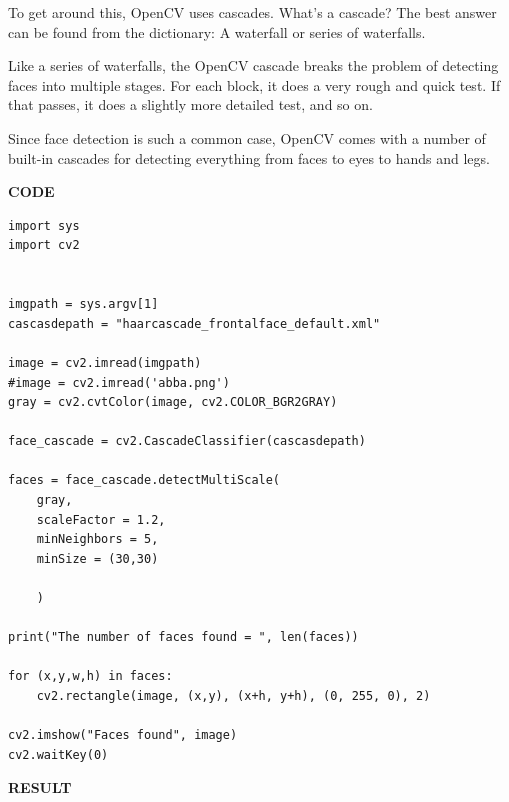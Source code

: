 \documentclass[14pt,a4paper]{article}
\begin{document}
\par To get around this, OpenCV uses cascades. What’s a cascade? The best answer can be found from the dictionary: A waterfall or series of waterfalls.
\par Like a series of waterfalls, the OpenCV cascade breaks the problem of detecting faces into multiple stages. For each block, it does a very rough and quick test. If that passes, it does a slightly more detailed test, and so on.
\par Since face detection is such a common case, OpenCV comes with a number of built-in cascades for detecting everything from faces to eyes to hands and legs.
\par
\textbf{CODE}
\begin{lstlisting}
import sys
import cv2


imgpath = sys.argv[1]
cascasdepath = "haarcascade_frontalface_default.xml"

image = cv2.imread(imgpath)
#image = cv2.imread('abba.png')
gray = cv2.cvtColor(image, cv2.COLOR_BGR2GRAY)

face_cascade = cv2.CascadeClassifier(cascasdepath)

faces = face_cascade.detectMultiScale(
    gray,
    scaleFactor = 1.2,
    minNeighbors = 5,
    minSize = (30,30)

    )

print("The number of faces found = ", len(faces))

for (x,y,w,h) in faces:
    cv2.rectangle(image, (x,y), (x+h, y+h), (0, 255, 0), 2)

cv2.imshow("Faces found", image)    
cv2.waitKey(0)
\end{lstlisting}
\par \textbf{RESULT}
\end{document}
